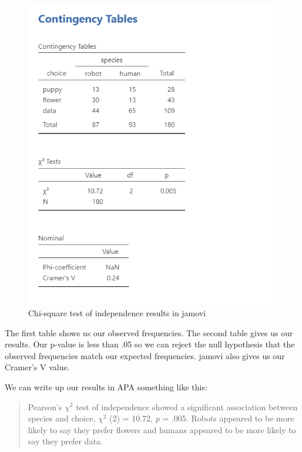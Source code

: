 \documentclass[
]{book}
\begin{document}
\begin{figure}

{\centering \includegraphics[width=1\linewidth]{images/11-independence/independence_results} 

}

\caption{Chi-square test of independence results in jamovi}\label{fig:unnamed-chunk-3}
\end{figure}

The first table shows us our observed frequencies. The second table gives us our results. Our p-value is less than .05 so we can reject the null hypothesis that the observed frequencies match our expected frequencies. jamovi also gives us our Cramer's V value.

We can write up our results in APA something like this:

\begin{quote}
Pearson's \(\chi^2\) test of independence showed a significant association between species and choice, \(\chi^2\) (2) = 10.72, \emph{p} = .005. Robots appeared to be more likely to say they prefer flowers and humans appeared to be more likely to say they prefer data.
\end{quote}
\end{document}
